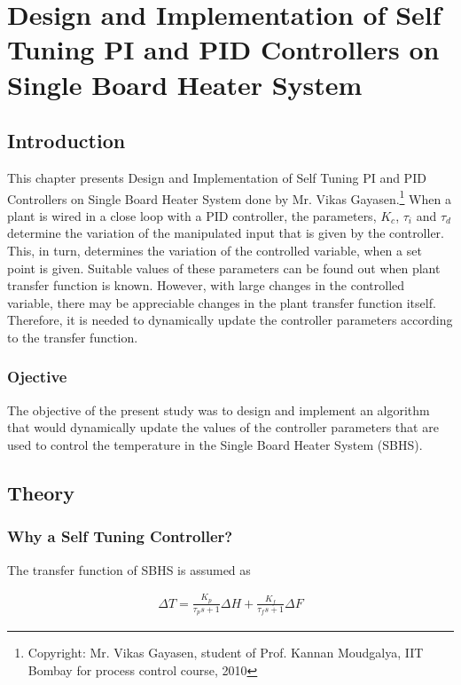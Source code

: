 
\chapter{Design and Implementation of Self Tuning PI and PID Controllers on Single Board Heater System}

\section{Introduction}%
This chapter presents Design and Implementation of Self Tuning PI and PID Controllers on Single Board Heater System done by Mr. Vikas Gayasen.\footnote{Copyright: Mr. Vikas Gayasen, student of Prof. Kannan Moudgalya, IIT Bombay for process control course, 2010}
When a plant is wired in a close loop with a PID controller, the parameters, $K_c$, $\tau_i$ and $\tau_d$ determine the variation of the manipulated input that is given by the controller. This, in turn, determines the variation of the controlled variable, when a set point is given. Suitable values of these parameters can be found out when plant transfer function is known. However, with large changes in the controlled variable, there may be appreciable changes in the plant transfer function itself. Therefore, it is needed to dynamically update the controller parameters according to the transfer function.

\subsection{Ojective}%
The objective of the present study was to design and implement an algorithm that would dynamically update the values of the controller parameters that are used to control the temperature in the Single Board Heater System (SBHS).



\section{Theory}
\subsection{Why a Self Tuning Controller?}
The transfer function of SBHS is assumed as 


\begin{align}
\Delta T = \frac {K_p}{\tau_ps+1} \Delta H + \frac {K_f}{\tau_fs+1} \Delta F 
\end{align}
 
